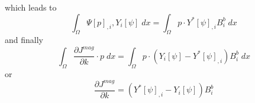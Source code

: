 which leads to 
\begin{equation}\label{ref:MAG:EQU:20ee}
\int_{\Omega} \Psi[p]_{,i} ,Y_i[\psi]  \; dx  = \int_{\Omega}  p \cdot Y^*[\psi]_{,i}  B^b_i \; dx  
\end{equation}
and finally
\begin{equation}\label{ref:MAG:EQU:201a}
\int_{\Omega}   \frac{\partial J^{mag}}{\partial k} \cdot p \;  dx  = \int_{\Omega}  
p \cdot (Y_i[\psi] - Y^*[\psi]_{,i})  B^b_i \; dx  
\end{equation} 
or 
\begin{equation}\label{ref:MAG:EQU:201b}
\frac{\partial J^{mag}}{\partial k} = (Y^*[\psi]_{,i}-Y_i[\psi])  B^b_i
\end{equation} 